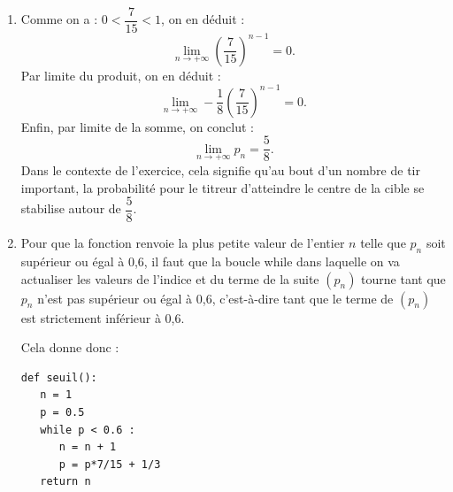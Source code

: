 \documentclass[10pt]{article}
\begin{document}
\begin{enumerate}
\begin{enumerate}
\item En partant de la définition de la suite $(u_n)$, pour un entier $n$ naturel non nul, on a :
\[
\begin{aligned}
u_n=p_n-\dfrac58&\Longleftrightarrow p_n=\dfrac58+u_n\\
&\Longleftrightarrow p_n=\dfrac58-\dfrac18\left(\dfrac7{15}\right)^{n-1}.
\end{aligned}
\]
\end{enumerate}

\item Comme on a : $0<\dfrac7{15}<1$, on en déduit :
\[
\lim_{n\to +\infty}\left(\dfrac7{15}\right)^{n-1}=0.
\]
Par limite du produit, on en déduit :
\[
\lim_{n\to +\infty}-\dfrac18\left(\dfrac7{15}\right)^{n-1}=0.
\]
Enfin, par limite de la somme, on conclut :
\[
\lim_{n\to +\infty}p_n=\dfrac58.
\]
Dans le contexte de l'exercice, cela signifie qu'au bout d'un nombre de tir important, la probabilité pour le titreur d'atteindre le centre de la cible se stabilise autour de $\dfrac58$.

\item Pour que la fonction renvoie la plus petite valeur de l'entier $n$ telle que $p_n$ soit supérieur ou égal à 0,6, il faut que la boucle while dans laquelle on va actualiser les valeurs de l'indice et du terme de la suite $(p_n)$ tourne tant que $p_n$ n'est pas supérieur ou égal à 0,6, c'est-à-dire tant que le terme de $(p_n)$ est strictement inférieur à 0,6.

Cela donne donc :

\begin{minipage}{0.4\linewidth}\begin{lstlisting}[style=python]
def seuil():
   n = 1
   p = 0.5
   while p < 0.6 :
      n = n + 1
      p = p*7/15 + 1/3
   return n
\end{lstlisting}\end{minipage}


\end{enumerate}
\end{document}
